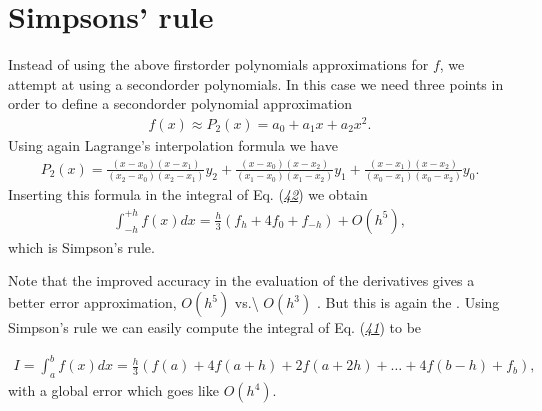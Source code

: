 \documentclass[letterpaper,10pt,english]{sphinxmanual}
\begin{document}
\section{Simpsons’ rule}
\label{\detokenize{chapter1:simpsons-rule}}
Instead of using the above first\sphinxhyphen{}order polynomials
approximations for \(f\), we attempt at using a second\sphinxhyphen{}order polynomials.
In this case we need three points in order to define a second\sphinxhyphen{}order
polynomial approximation
\begin{equation*}
\begin{split}
f(x) \approx P_2(x)=a_0+a_1x+a_2x^2.
\end{split}
\end{equation*}
Using again Lagrange’s interpolation formula we have
\begin{equation*}
\begin{split}
P_2(x)=\frac{(x-x_0)(x-x_1)}{(x_2-x_0)(x_2-x_1)}y_2+
            \frac{(x-x_0)(x-x_2)}{(x_1-x_0)(x_1-x_2)}y_1+
            \frac{(x-x_1)(x-x_2)}{(x_0-x_1)(x_0-x_2)}y_0.
\end{split}
\end{equation*}
Inserting this formula in the integral of Eq.  ({\hyperref[\detokenize{chapter1:eq:hhint}]{\emph{42}}}) we obtain
\begin{equation*}
\begin{split}
\int_{-h}^{+h}f(x)dx=\frac{h}{3}\left(f_h + 4f_0 + f_{-h}\right)+O(h^5),
\end{split}
\end{equation*}
which is Simpson’s rule.

Note that the improved accuracy in the evaluation of
the derivatives gives a better error approximation, \(O(h^5)\) vs.\textbackslash{} \(O(h^3)\) .
But this is again the .
Using Simpson’s rule we can easily compute
the integral     of Eq.  ({\hyperref[\detokenize{chapter1:eq:integraldef}]{\emph{41}}}) to be




\begin{equation*}
\begin{split}
\begin{equation}
   I=\int_a^bf(x) dx=\frac{h}{3}\left(f(a) + 4f(a+h) +2f(a+2h)+
                          \dots +4f(b-h)+ f_{b}\right),
\label{eq:simpson} \tag{46}
\end{equation}
\end{split}
\end{equation*}
with a global error which goes like \(O(h^4)\).
\end{document}
